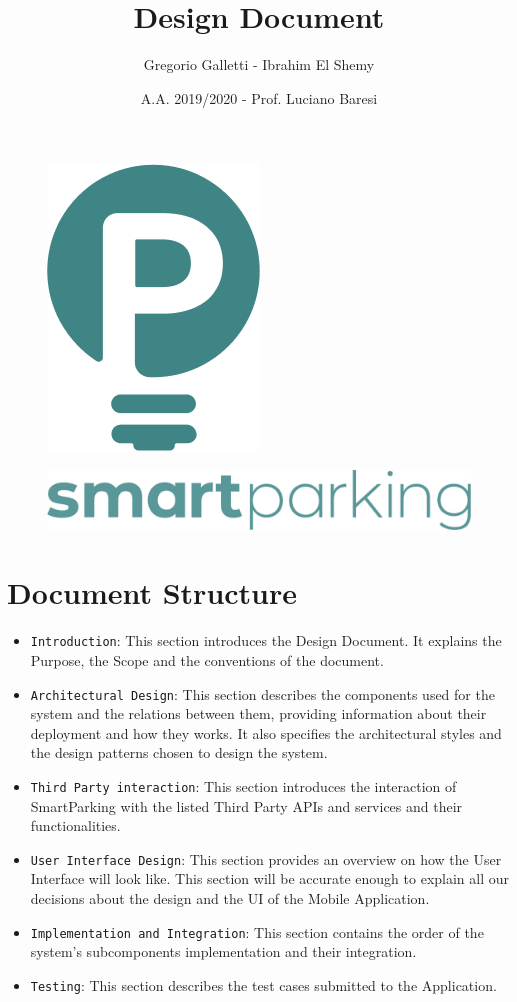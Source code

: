 \documentclass[11pt]{article} %
\title{Design Document}
\author{Gregorio Galletti - Ibrahim El Shemy}
\date{A.A. 2019/2020 - Prof. Luciano Baresi} %
\begin{document}
\begin{figure}[H]
\centering
\includegraphics[scale=0.3]{logoP_green.png}
\end{figure}
\begin{figure}[H]
\centering
\includegraphics[width=\textwidth,height=\textheight,keepaspectratio]{logoText_green.png}
\end{figure}
\maketitle

\tableofcontents
\newpage

\section{Document Structure}
\begin{itemize}

\item \texttt{Introduction}: This section introduces the Design Document. It explains the Purpose, the Scope and the conventions of the document.
\item \texttt{Architectural Design}: This section describes the components used for the system and the relations between them, providing information about their deployment and how they works. It also specifies the architectural styles and the design patterns chosen to design the system.
\item \texttt{Third Party interaction}: This section introduces the interaction of SmartParking with the listed Third Party APIs and services and their functionalities.
\item \texttt{User Interface Design}: This section provides an overview on how the User Interface will look like. This section will be accurate enough to explain all our decisions about the design and the UI of the Mobile Application. 
\item \texttt{Implementation and Integration}: This section contains the order of the system's subcomponents implementation and their integration.
\item \texttt{Testing}: This section describes the test cases submitted to the Application.


\end{itemize}
\end{document}
